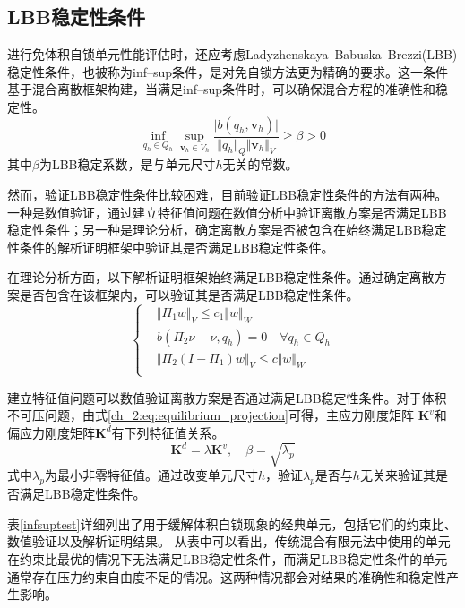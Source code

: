 \subsection{LBB稳定性条件}
进行免体积自锁单元性能评估时，还应考虑Ladyzhenskaya--Babuska--Brezzi(LBB)稳定性条件，也被称为inf--sup条件\cite{babuska1997a,bathe1996}，是对免自锁方法更为精确的要求。这一条件基于混合离散框架构建，当满足inf--sup条件时，可以确保混合方程的准确性和稳定性。
\begin{equation}\label{ch:2:eq:LBB}
    \inf_{q_h \in Q_h} \sup_{\boldsymbol v_h \in V_h} \frac{\vert b(q_h,\boldsymbol v_h) \vert}{\Vert q_h \Vert_Q \Vert \boldsymbol v_h \Vert_V} \ge \beta > 0
\end{equation}
其中$\beta$为LBB稳定系数，是与单元尺寸$h$无关的常数。

然而，验证LBB稳定性条件比较困难，目前验证LBB稳定性条件的方法有两种。一种是数值验证，通过建立特征值问题\cite{chapelle1993}在数值分析中验证离散方案是否满足LBB稳定性条件；另一种是理论分析，确定离散方案是否被包含在始终满足LBB稳定性条件的解析证明框架\cite{chapelle1993}中验证其是否满足LBB稳定性条件。

在理论分析方面，以下解析证明框架始终满足LBB稳定性条件。通过确定离散方案是否包含在该框架内，可以验证其是否满足LBB稳定性条件。
\begin{equation}\label{analy}
    \begin{cases}
        &\Vert\Pi_1 w\Vert_V \le c_1\Vert w\Vert_W \\
        &b(\Pi_2\nu-\nu,q_h)=0 \quad \forall q_h \in Q_h\\
        &\Vert \Pi_2(I-\Pi_1)w \Vert_V \le c \Vert w\Vert_W \\
    \end{cases}
\end{equation}

建立特征值问题可以数值验证离散方案是否通过满足LBB稳定性条件。对于体积不可压问题，由式\eqref{ch_2:eq:equilibrium_projection}可得，主应力刚度矩阵 $\boldsymbol K^v$和偏应力刚度矩阵$ \boldsymbol K^d$有下列特征值关系。
\begin{equation}\label{ch_2:eq:eigenvalue}
    \boldsymbol K^d=\lambda\boldsymbol K^v,\quad \beta=\sqrt{\lambda_p}
\end{equation}
式中$\lambda_p$为最小非零特征值。通过改变单元尺寸$h$，验证$\lambda_p$是否与$h$无关来验证其是否满足LBB稳定性条件。

表\ref{infsuptest}详细列出了用于缓解体积自锁现象的经典单元，包括它们的约束比、数值验证以及解析证明结果。
从表中可以看出，传统混合有限元法中使用的单元在约束比最优的情况下无法满足LBB稳定性条件，而满足LBB稳定性条件的单元通常存在压力约束自由度不足的情况。这两种情况都会对结果的准确性和稳定性产生影响。

